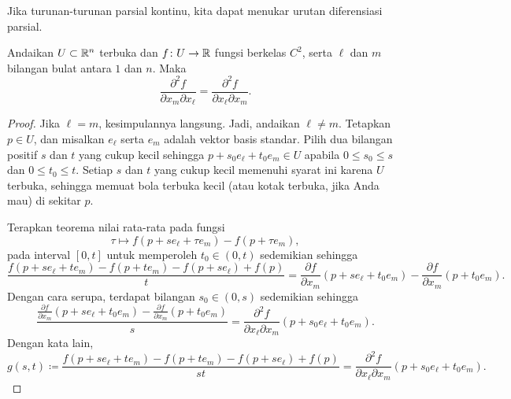 Jika turunan-turunan parsial kontinu, kita dapat menukar urutan diferensiasi parsial.

\begin{prop} \label{mv:prop:swapders}
Andaikan $U \subset {\mathbb{R}}^n$ terbuka dan $f \colon U \to {\mathbb{R}}$ fungsi berkelas $C^2$,
serta $\ell$ dan $m$ bilangan bulat antara $1$ dan $n$.  Maka
\begin{equation*}
\frac{\partial^2 f}{\partial x_m \partial x_{\ell}}
=
\frac{\partial^2 f}{\partial x_{\ell} \partial x_m} .
\end{equation*}
\end{prop}

\begin{proof}
Jika $\ell=m$, kesimpulannya langsung.  Jadi, andaikan $\ell \neq m$.
Tetapkan $p \in U$, dan misalkan $e_{\ell}$ serta $e_m$ adalah vektor basis standar.
Pilih dua bilangan positif $s$ dan $t$ yang cukup kecil sehingga
$p+s_0e_{\ell} +t_0e_m \in U$ apabila
$0 \leq s_0 \leq s$ dan $0 \leq t_0 \leq t$.
Setiap $s$ dan $t$ yang cukup kecil memenuhi syarat ini karena $U$ terbuka, sehingga
memuat bola terbuka kecil (atau kotak terbuka, jika Anda mau) di sekitar $p$.

Terapkan teorema nilai rata-rata pada fungsi
\begin{equation*}
\tau \mapsto f(p+se_{\ell} + \tau e_m)-f(p + \tau e_m) ,
\end{equation*}
pada interval $[0,t]$
untuk memperoleh $t_0 \in (0,t)$
sedemikian sehingga
\begin{equation*}
\frac{f(p+se_{\ell} + te_m)- f(p+t e_m) - f(p+s e_{\ell})+f(p)}{t}
=
\frac{\partial f}{\partial x_m}(p + s e_{\ell} + t_0 e_m)
-
\frac{\partial f}{\partial x_m}(p + t_0 e_m) .
\end{equation*}
Dengan cara serupa, terdapat bilangan $s_0 \in (0,s)$ sedemikian sehingga
\begin{equation*}
\frac{\frac{\partial f}{\partial x_m}(p + s e_{\ell} + t_0 e_m)
-
\frac{\partial f}{\partial x_m}(p + t_0 e_m)}{s}
=
\frac{\partial^2 f}{\partial x_{\ell} \partial x_m}(p + s_0 e_{\ell} + t_0 e_m) .
\end{equation*}
Dengan kata lain,
\begin{equation*}
g(s,t)
\coloneqq
\frac{f(p+se_{\ell} + te_m)- f(p+t e_m) - f(p+s e_{\ell})+f(p)}{st}
=
\frac{\partial^2 f}{\partial x_{\ell} \partial x_m}(p + s_0 e_{\ell} + t_0 e_m) .
\end{equation*}


\end{proof}
